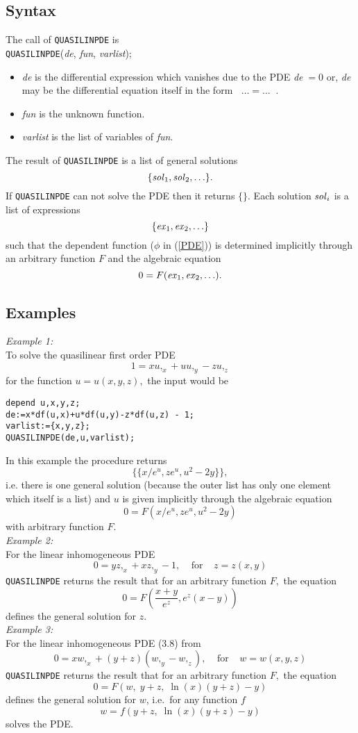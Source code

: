 \documentclass[12pt]{article}
\begin{document}
\subsection{Syntax}
The call of {\tt QUASILINPDE} is \\
{\tt QUASILINPDE}({\it de}, {\it fun}, {\it varlist});
\begin{itemize}
\item
{\it de} is the differential expression which vanishes due to the PDE
{\it de}$\; = 0$ or, {\it de} may be the differential equation itself in the
form $\;\;\ldots = \ldots\;\;$.
\item
{\it fun} is the unknown function.
\item
{\it varlist} is the list of variables of {\it fun}.
\end{itemize}
The result of {\tt QUASILINPDE} is a list of general solutions
\[      \{{\it sol}_1, {\it sol}_2, \ldots \}.  \]
If {\tt QUASILINPDE} can not solve the PDE then it returns $\{\}$.
Each solution ${\it sol}_i$ is a list of expressions
\[      \{{\it ex}_1, {\it ex}_2, \ldots \}  \]
such that the dependent function ($\phi$ in (\ref{PDE})) is determined
implicitly through an arbitrary function $F$ and the algebraic
equation \[ 0 = F({\it ex}_1, {\it ex}_2, \ldots). \]
\subsection{Examples}
{\em Example 1:}\\
To solve the quasilinear first order PDE \[1 = xu,_x + uu,_y - zu,_z\]
for the function $u = u(x,y,z),$ the input would be
\small \begin{verbatim}
depend u,x,y,z;
de:=x*df(u,x)+u*df(u,y)-z*df(u,z) - 1;
varlist:={x,y,z};
QUASILINPDE(de,u,varlist);
\end{verbatim} \normalsize
In this example the procedure returns
\[\{ \{ x/e^u, ze^u, u^2 - 2y \} \},\] 
i.e. there is one general solution (because the outer list has only one
element which itself is a list) and $u$ is given implicitly through 
the algebraic equation
\[ 0 = F(x/e^u, ze^u, u^2 - 2y)\] 
with arbitrary function $F.$ \\
{\em Example 2:}\\
For the linear inhomogeneous PDE
\[ 0 = y z,_x + x z,_y - 1, \;\;\;\;\mbox{for}\;\;\;\;z=z(x,y)\]
{\tt QUASILINPDE} returns the result that for an arbitrary function $F,$ the
equation
\[ 0 = F\left(\frac{x+y}{e^z},e^z(x-y)\right) \]
defines the general solution for $z$. \\
{\em Example 3:}\\
For the linear inhomogeneous PDE (3.8) from \cite{KamkePDE}
\[ 0 = x w,_x + (y+z)(w,_y - w,_z), \;\;\;\;\mbox{for}\;\;\;\;w=w(x,y,z)\]
{\tt QUASILINPDE} returns the result 
that for an arbitrary function $F,$ the equation
\[ 0 = F\left(w, \;y+z, \;\ln(x)(y+z)-y\right) \]
defines the general solution for $w$, i.e.\ for any function $f$
\[ w = f\left(y+z, \;\ln(x)(y+z)-y\right) \]
solves the PDE.
\end{document}
